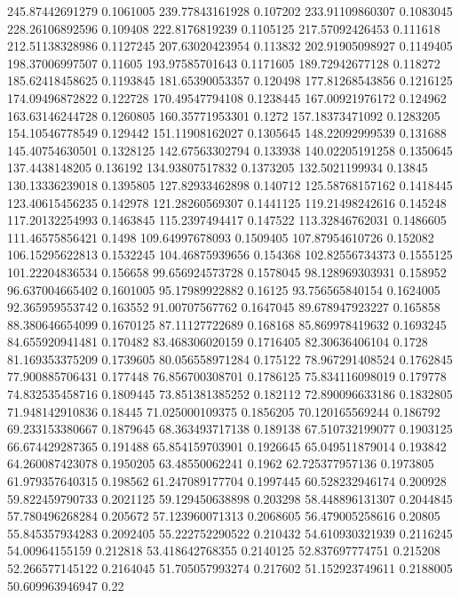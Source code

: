 245.87442691279 0.1061005
239.77843161928 0.107202
233.91109860307 0.1083045
228.26106892596 0.109408
222.8176819239 0.1105125
217.57092426453 0.111618
212.51138328986 0.1127245
207.63020423954 0.113832
202.91905098927 0.1149405
198.37006997507 0.11605
193.97585701643 0.1171605
189.72942677128 0.118272
185.62418458625 0.1193845
181.65390053357 0.120498
177.81268543856 0.1216125
174.09496872822 0.122728
170.49547794108 0.1238445
167.00921976172 0.124962
163.63146244728 0.1260805
160.35771953301 0.1272
157.18373471092 0.1283205
154.10546778549 0.129442
151.11908162027 0.1305645
148.22092999539 0.131688
145.40754630501 0.1328125
142.67563302794 0.133938
140.02205191258 0.1350645
137.4438148205 0.136192
134.93807517832 0.1373205
132.5021199934 0.13845
130.13336239018 0.1395805
127.82933462898 0.140712
125.58768157162 0.1418445
123.40615456235 0.142978
121.28260569307 0.1441125
119.21498242616 0.145248
117.20132254993 0.1463845
115.2397494417 0.147522
113.32846762031 0.1486605
111.46575856421 0.1498
109.64997678093 0.1509405
107.87954610726 0.152082
106.15295622813 0.1532245
104.46875939656 0.154368
102.82556734373 0.1555125
101.22204836534 0.156658
99.656924573728 0.1578045
98.128969303931 0.158952
96.637004665402 0.1601005
95.17989922882 0.16125
93.756565840154 0.1624005
92.365959553742 0.163552
91.00707567762 0.1647045
89.678947923227 0.165858
88.380646654099 0.1670125
87.11127722689 0.168168
85.869978419632 0.1693245
84.655920941481 0.170482
83.468306020159 0.1716405
82.30636406104 0.1728
81.169353375209 0.1739605
80.056558971284 0.175122
78.967291408524 0.1762845
77.900885706431 0.177448
76.856700308701 0.1786125
75.834116098019 0.179778
74.832535458716 0.1809445
73.851381385252 0.182112
72.890096633186 0.1832805
71.948142910836 0.18445
71.025000109375 0.1856205
70.120165569244 0.186792
69.233153380667 0.1879645
68.363493717138 0.189138
67.510732199077 0.1903125
66.674429287365 0.191488
65.854159703901 0.1926645
65.049511879014 0.193842
64.260087423078 0.1950205
63.48550062241 0.1962
62.725377957136 0.1973805
61.979357640315 0.198562
61.247089177704 0.1997445
60.528232946174 0.200928
59.822459790733 0.2021125
59.129450638898 0.203298
58.448896131307 0.2044845
57.780496268284 0.205672
57.123960071313 0.2068605
56.479005258616 0.20805
55.845357934283 0.2092405
55.222752290522 0.210432
54.610930321939 0.2116245
54.00964155159 0.212818
53.418642768355 0.2140125
52.837697774751 0.215208
52.266577145122 0.2164045
51.705057993274 0.217602
51.152923749611 0.2188005
50.609963946947 0.22

